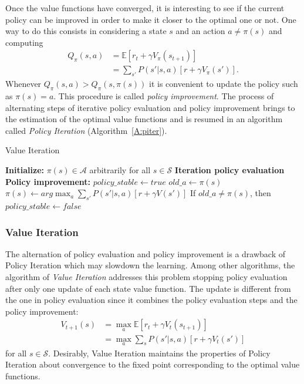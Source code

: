 Once the value functions have converged, it is interesting to see if the current policy can be improved in order to make it closer to the optimal one or not. One way to do this consists in considering a state $s$ and an action $a \neq \pi(s)$ and computing
\begin{align}
 Q_\pi(s,a) &= \mathbb{E}[r_t + \gamma V_\pi(s_{t+1})]\nonumber\\
            &= \sum_{s'} P(s' | s,a)[r + \gamma V_\pi(s')].
\end{align}
Whenever $Q_\pi(s,a) > Q_\pi(s, \pi(s))$ it is convenient to update the policy such as $\pi(s) = a$. This procedure is called \textit{policy improvement}.
The process of alternating steps of iterative policy evaluation and policy improvement brings to the estimation of the optimal value functions and is resumed in an algorithm called \textit{Policy Iteration} (Algorithm~\ref{A:piter}).
\begin{algorithm}[t]
 \caption{Value Iteration}
 \begin{algorithmic}[1]\label{A:piter}
  \STATE \textbf{Initialize:} $\pi(s) \in \mathcal{A}$ arbitrarily for all $s \in \mathcal{S}$
  \REPEAT
  \STATE \textbf{Iteration policy evaluation}
  \STATE \textbf{Policy improvement:}
  \STATE $policy\_stable \leftarrow true$
  \STATE $old\_a \leftarrow \pi(s)$
  \STATE $\pi(s) \leftarrow arg\max_a \sum_{s'} P(s'|s,a)[r + \gamma V(s')]$
  \STATE If $old\_a \neq \pi(s)$, then $policy\_stable \leftarrow false$
  \ENDFOR
 \end{algorithmic}
\end{algorithm}

\subsubsection{Value Iteration}
The alternation of policy evaluation and policy improvement is a drawback of Policy Iteration which may slowdown the learning. Among other algorithms, the algorithm of \textit{Value Iteration} addresses this problem stopping policy evaluation after only one update of each state value function. The update is different from the one in policy evaluation since it combines the policy evaluation steps and the policy improvement:
\begin{align}
 V_{t+1} (s) &= \max_a \mathbb{E}[r_t + \gamma V_t(s_{t+1})]\nonumber\\
             &= \max_a \sum_s P(s' | s, a)[r + \gamma V_t(s')]
\end{align}
for all $s \in \mathcal{S}$. Desirably, Value Iteration maintains the properties of Policy Iteration about convergence to the fixed point corresponding to the optimal value functions.

